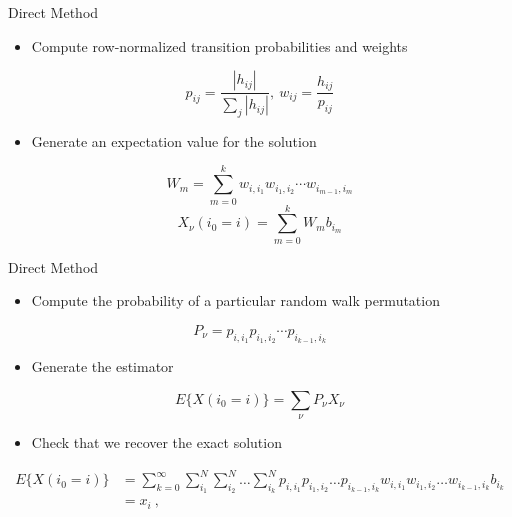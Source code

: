 \documentclass{beamer}
\begin{document}
\begin{frame}{Direct Method}

  \begin{itemize}
    \item Compute row-normalized transition probabilities and weights
  \end{itemize}

  \[
  p_{ij} = \frac{|h_{ij}|}{\sum_j |h_{ij}|},\ w_{ij} =
  \frac{h_{ij}}{p_{ij}}
  \]

  \begin{itemize}
    \item Generate an expectation value for the solution
  \end{itemize}

  \[
  W_{m} = \sum_{m=0}^k w_{i,i_1} w_{i_1,i_2} \cdots w_{i_{m-1},i_m}
  \]
  \[
  X_{\nu}(i_0 = i) = \sum_{m=0}^k W_{m} b_{i_m}
  \]
\end{frame}

\begin{frame}{Direct Method}

  \begin{itemize}
    \item Compute the probability of a particular random walk permutation
  \end{itemize}

  \[
  P_{\nu} = p_{i,i_1} p_{i_1,i_2} \cdots p_{i_{k-1},i_k}
  \]

  \begin{itemize}
  \item Generate the estimator
  \end{itemize}

  \[
  E\{X(i_0 = i)\} = \sum_{\nu} P_{\nu} X_{\nu}
  \]

  \begin{itemize}
  \item Check that we recover the exact solution
  \end{itemize}

  \[
  \begin{split}
    E\{X(i_0 = i)\}
    &=\sum_{k=0}^{\infty}\sum_{i_1}^{N}\sum_{i_2}^{N}\ldots
    \sum_{i_k}^{N} p_{i,i_1}p_{i_1,i_2}\ldots p_{i_{k-1},i_k}
    w_{i,i_1}w_{i_1,i_2}\ldots w_{i_{k-1},i_k} b_{i_k}\\ &= x_i\:,
  \end{split}
  \]

\end{frame}
\end{document}
